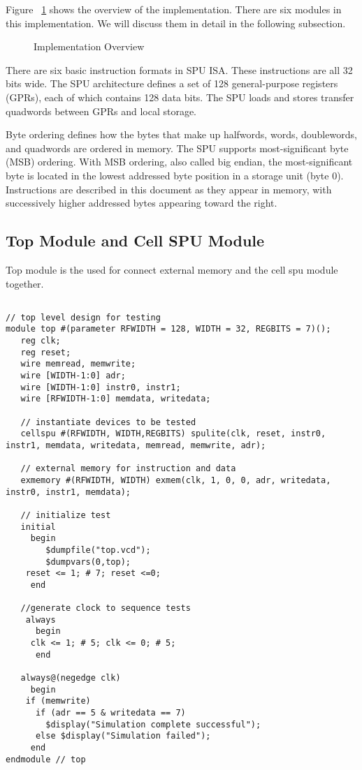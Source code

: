 \documentclass[preprint,authoryear,12pt]{elsarticle}
\begin{document}
Figure ~\ref{fig:bigview} shows the overview of the
implementation. There are six modules in this implementation. We will
discuss them in detail in the following subsection.

\begin{figure}
\centering
{}
\caption{Implementation Overview}
\label{fig:bigview}
\end{figure}

There are six basic instruction formats in SPU ISA. These instructions
are all 32 bits wide. The SPU architecture defines a set of 128
general-purpose registers (GPRs), each of which contains 128 data
bits. The SPU loads and stores transfer quadwords between GPRs and local
storage.

Byte ordering defines how the bytes that make up halfwords, words,
doublewords, and quadwords are ordered in memory. The SPU supports
most-significant byte (MSB) ordering. With MSB ordering, also called
big endian, the most-significant byte is located in the lowest
addressed byte position in a storage unit (byte 0). Instructions are
described in this document as they appear in memory, with successively
higher addressed bytes appearing toward the right.

\subsection{Top Module and Cell SPU Module}

Top module is the used for connect external memory and the cell spu
module together.

\begin{verbatim}

// top level design for testing
module top #(parameter RFWIDTH = 128, WIDTH = 32, REGBITS = 7)();
   reg clk;
   reg reset;
   wire memread, memwrite;
   wire [WIDTH-1:0] adr;
   wire [WIDTH-1:0] instr0, instr1;
   wire [RFWIDTH-1:0] memdata, writedata;

   // instantiate devices to be tested
   cellspu #(RFWIDTH, WIDTH,REGBITS) spulite(clk, reset, instr0, instr1, memdata, writedata, memread, memwrite, adr);

   // external memory for instruction and data
   exmemory #(RFWIDTH, WIDTH) exmem(clk, 1, 0, 0, adr, writedata, instr0, instr1, memdata);
   
   // initialize test
   initial
     begin
        $dumpfile("top.vcd");
        $dumpvars(0,top);
	reset <= 1; # 7; reset <=0;
     end

   //generate clock to sequence tests
    always
      begin
	 clk <= 1; # 5; clk <= 0; # 5;
      end

   always@(negedge clk)
     begin
	if (memwrite)
	  if (adr == 5 & writedata == 7)
	    $display("Simulation complete successful");
	  else $display("Simulation failed");
     end
endmodule // top

\end{verbatim}
\end{document}
